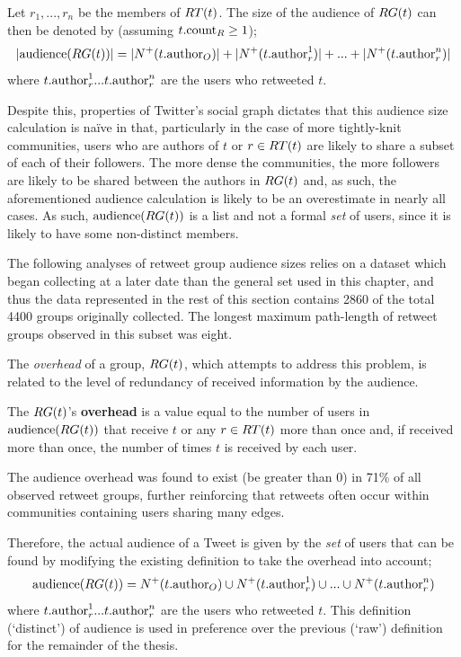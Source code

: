Let $ r_1,...,r_n $ be the members of $RT(t)$. The size of the audience of $RG(t)$ can then be denoted by (assuming $t.\textrm{count}_R \geq 1$);
\[
	|\textrm{audience}(RG(t))| = |N^+(t.\textrm{author}_O)| + |N^+(t.\textrm{author}_r^1)| + ... + |N^+(t.\textrm{author}_r^n)| 
\]
where $t.\textrm{author}_r^1 ... t.\textrm{author}_r^n$ are the users who retweeted $t$.

Despite this, properties of Twitter's social graph dictates that this audience size calculation is na{\"i}ve in that, particularly in the case of more tightly-knit communities, users who are authors of $t$ or $r \in RT(t)$ are likely to share a subset of each of their followers. The more dense the communities, the more followers are likely to be shared between the authors in $RG(t)$ and, as such, the aforementioned audience calculation is likely to be an overestimate in nearly all cases. As such, $\textrm{audience}(RG(t))$ is a list and not a formal \textit{set} of users, since it is likely to have some non-distinct members.

The following analyses of retweet group audience sizes relies on a dataset which began collecting at a later date than the general set used in this chapter, and thus the data represented in the rest of this section contains 2860 of the total 4400 groups originally collected. The longest maximum path-length of retweet groups observed in this subset was eight.

The \textit{overhead} of a group, $RG(t)$, which attempts to address this problem, is related to the level of redundancy of received information by the audience.

\begin{mydefinition}
    The $RG(t)$'s \textbf{overhead} is a value equal to the number of users in $\textrm{audience}(RG(t))$ that receive $t$ or any $r \in RT(t)$ more than once and, if received more than once, the number of times $t$ is received by each user.
\end{mydefinition}

The audience overhead was found to exist (be greater than 0) in 71\% of all observed retweet groups, further reinforcing that retweets often occur within communities containing users sharing many edges.

Therefore, the actual audience of a Tweet is given by the \textit{set} of users that can be found by modifying the existing definition to take the overhead into account;
\[
	\textrm{audience}(RG(t)) = N^+(t.\textrm{author}_O) \cup N^+(t.\textrm{author}_r^1) \cup ... \cup N^+(t.\textrm{author}_r^n)
\]
where $t.\textrm{author}_r^1 ... t.\textrm{author}_r^n$ are the users who retweeted $t$. This definition (`distinct') of audience is used in preference over the previous (`raw') definition for the remainder of the thesis.

